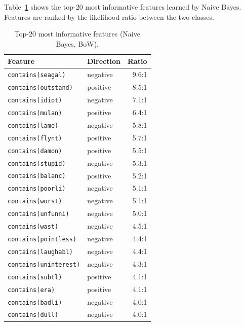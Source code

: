 \documentclass[11pt,a4paper]{article}
\begin{document}
Table~\ref{tab:features} shows the top-20 most informative features learned by Naive
Bayes. Features are ranked by the likelihood ratio between the two classes.

\begin{table}[H]
  \centering
  \caption{Top-20 most informative features (Naive Bayes, BoW).}
  \label{tab:features}
  \small
  \begin{tabular}{llr}
    \toprule
    \textbf{Feature} & \textbf{Direction} & \textbf{Ratio} \\
    \midrule
    \texttt{contains(seagal)}     & negative & 9.6:1 \\
    \texttt{contains(outstand)}   & positive & 8.5:1 \\
    \texttt{contains(idiot)}      & negative & 7.1:1 \\
    \texttt{contains(mulan)}      & positive & 6.4:1 \\
    \texttt{contains(lame)}       & negative & 5.8:1 \\
    \texttt{contains(flynt)}      & positive & 5.7:1 \\
    \texttt{contains(damon)}      & positive & 5.5:1 \\
    \texttt{contains(stupid)}     & negative & 5.3:1 \\
    \texttt{contains(balanc)}     & positive & 5.2:1 \\
    \texttt{contains(poorli)}     & negative & 5.1:1 \\
    \texttt{contains(worst)}      & negative & 5.1:1 \\
    \texttt{contains(unfunni)}    & negative & 5.0:1 \\
    \texttt{contains(wast)}       & negative & 4.5:1 \\
    \texttt{contains(pointless)}  & negative & 4.4:1 \\
    \texttt{contains(laughabl)}   & negative & 4.4:1 \\
    \texttt{contains(uninterest)} & negative & 4.3:1 \\
    \texttt{contains(subtl)}      & positive & 4.1:1 \\
    \texttt{contains(era)}        & positive & 4.1:1 \\
    \texttt{contains(badli)}      & negative & 4.0:1 \\
    \texttt{contains(dull)}       & negative & 4.0:1 \\
    \bottomrule
  \end{tabular}
\end{table}
\end{document}
